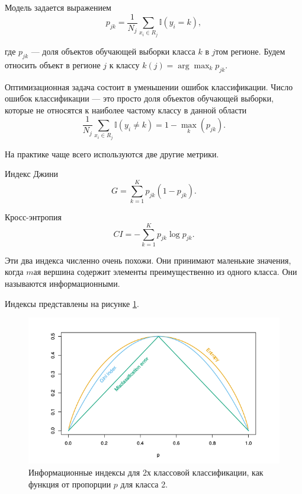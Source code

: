 \documentclass[14pt, a4paper]{article}
\begin{document}
Модель задается выражением 
\begin{equation}
p_{jk} = \frac{1}{N_j} \sum_{x_i \in R_j} \mathbb{I}(y_i = k), 
\end{equation}

где $p_{jk}$ --- доля объектов обучающей выборки класса $k$ в $j$том регионе. Будем относить объект в регионе $j$ к классу $k(j) = \arg\max _k p_{jk}$. 

Оптимизационная задача состоит в уменьшении ошибок классификации. Число ошибок классификации --- это просто доля объектов обучающей выборки, которые не относятся к наиболее частому классу в данной области
\begin{equation}
 \frac{1}{N_j} \sum_{x_i \in R_j} \mathbb{I}(y_i \neq  k) = 1 - \max_k(p_{jk}).
\end{equation}

На практике чаще всего используются две другие метрики.

Индекс Джини
\begin{equation}
G = \sum_{k = 1}^K p_{jk}(1 - p_{jk}).
\end{equation}

Кросс-энтропия
\begin{equation}
CI = - \sum_{k = 1}^K p_{jk} \log p_{jk}.
\end{equation}

Эти два индекса численно очень похожи. Они принимают маленькие значения, когда $m$ая вершина содержит элементы преимущественно из одного класса. Они называются информационными.

Индексы представлены на рисунке \ref{fig:index}.

\begin{figure}[h!]
\label{fig:index}
\centering
\includegraphics[scale=0.5]{indexes}
\caption{Информационные индексы для 2х классовой классификации, как функция от пропорции $p$ для класса 2.}
\end{figure}
\end{document}
